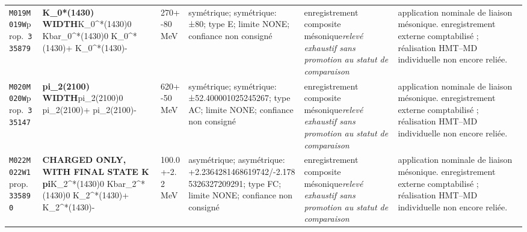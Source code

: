 \begin{landscape}
\begin{longtable}{L{1.85cm}L{4.45cm}L{2.35cm}L{4.05cm}L{3.35cm}L{7.15cm}}
\texttt{M019}\newline \texttt{M019W}\newline prop.\ \texttt{335879} & \textbf{K\_\allowbreak{}0*(1430) WIDTH}\newline K\_\allowbreak{}0\textasciicircum{}*(1430)0 \textbar{}\allowbreak{} Kbar\_\allowbreak{}0\textasciicircum{}*(1430)0 \textbar{}\allowbreak{} K\_\allowbreak{}0\textasciicircum{}*(1430)+ \textbar{}\allowbreak{} K\_\allowbreak{}0\textasciicircum{}*(1430)- & 270+-80\,MeV & symétrique; symétrique: ±80; type E; limite NONE; confiance non consigné & enregistrement composite mésonique\newline \emph{relevé exhaustif sans promotion au statut de comparaison} & application nominale de liaison mésonique. enregistrement externe comptabilisé ; réalisation HMT--MD individuelle non encore reliée. \\
\texttt{M020}\newline \texttt{M020W}\newline prop.\ \texttt{335147} & \textbf{pi\_\allowbreak{}2(2100) WIDTH}\newline pi\_\allowbreak{}2(2100)0 \textbar{}\allowbreak{} pi\_\allowbreak{}2(2100)+ \textbar{}\allowbreak{} pi\_\allowbreak{}2(2100)- & 620+-50\,MeV & symétrique; symétrique: ±52.400001025245267; type AC; limite NONE; confiance non consigné & enregistrement composite mésonique\newline \emph{relevé exhaustif sans promotion au statut de comparaison} & application nominale de liaison mésonique. enregistrement externe comptabilisé ; réalisation HMT--MD individuelle non encore reliée. \\
\texttt{M022}\newline \texttt{M022W1}\newline prop.\ \texttt{335890} & \textbf{CHARGED ONLY, WITH FINAL STATE K pi}\newline K\_\allowbreak{}2\textasciicircum{}*(1430)0 \textbar{}\allowbreak{} Kbar\_\allowbreak{}2\textasciicircum{}*(1430)0 \textbar{}\allowbreak{} K\_\allowbreak{}2\textasciicircum{}*(1430)+ \textbar{}\allowbreak{} K\_\allowbreak{}2\textasciicircum{}*(1430)- & 100.0+-2.2\,MeV & asymétrique; asymétrique: +2.2364281468619742/-2.1785326327209291; type FC; limite NONE; confiance non consigné & enregistrement composite mésonique\newline \emph{relevé exhaustif sans promotion au statut de comparaison} & application nominale de liaison mésonique. enregistrement externe comptabilisé ; réalisation HMT--MD individuelle non encore reliée. \\

\end{longtable}
\end{landscape}
